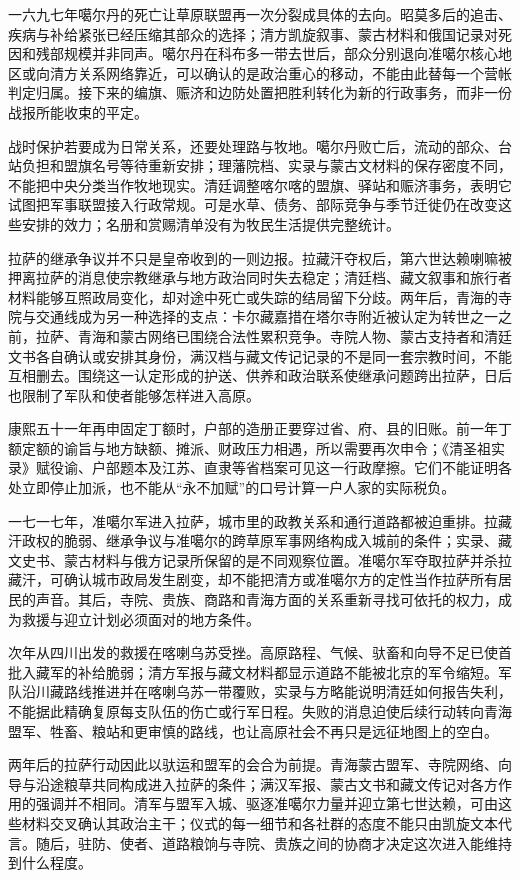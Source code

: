 一六九七年噶尔丹的死亡让草原联盟再一次分裂成具体的去向。昭莫多后的追击、疾病与补给紧张已经压缩其部众的选择；清方凯旋叙事、蒙古材料和俄国记录对死因和残部规模并非同声。噶尔丹在科布多一带去世后，部众分别退向准噶尔核心地区或向清方关系网络靠近，可以确认的是政治重心的移动，不能由此替每一个营帐判定归属。接下来的编旗、赈济和边防处置把胜利转化为新的行政事务，而非一份战报所能收束的平定。

战时保护若要成为日常关系，还要处理路与牧地。噶尔丹败亡后，流动的部众、台站负担和盟旗名号等待重新安排；理藩院档、实录与蒙古文材料的保存密度不同，不能把中央分类当作牧地现实。清廷调整喀尔喀的盟旗、驿站和赈济事务，表明它试图把军事联盟接入行政常规。可是水草、债务、部际竞争与季节迁徙仍在改变这些安排的效力；名册和赏赐清单没有为牧民生活提供完整统计。

拉萨的继承争议并不只是皇帝收到的一则边报。拉藏汗夺权后，第六世达赖喇嘛被押离拉萨的消息使宗教继承与地方政治同时失去稳定；清廷档、藏文叙事和旅行者材料能够互照政局变化，却对途中死亡或失踪的结局留下分歧。两年后，青海的寺院与交通线成为另一种选择的支点：卡尔藏嘉措在塔尔寺附近被认定为转世之一之前，拉萨、青海和蒙古网络已围绕合法性累积竞争。寺院人物、蒙古支持者和清廷文书各自确认或安排其身份，满汉档与藏文传记记录的不是同一套宗教时间，不能互相删去。围绕这一认定形成的护送、供养和政治联系使继承问题跨出拉萨，日后也限制了军队和使者能够怎样进入高原。

康熙五十一年再申固定丁额时，户部的造册正要穿过省、府、县的旧账。前一年丁额定额的谕旨与地方缺额、摊派、财政压力相遇，所以需要再次申令；《清圣祖实录》赋役谕、户部题本及江苏、直隶等省档案可见这一行政摩擦。它们不能证明各处立即停止加派，也不能从“永不加赋”的口号计算一户人家的实际税负。

一七一七年，准噶尔军进入拉萨，城市里的政教关系和通行道路都被迫重排。拉藏汗政权的脆弱、继承争议与准噶尔的跨草原军事网络构成入城前的条件；实录、藏文史书、蒙古材料与俄方记录所保留的是不同观察位置。准噶尔军夺取拉萨并杀拉藏汗，可确认城市政局发生剧变，却不能把清方或准噶尔方的定性当作拉萨所有居民的声音。其后，寺院、贵族、商路和青海方面的关系重新寻找可依托的权力，成为救援与迎立计划必须面对的地方条件。

次年从四川出发的救援在喀喇乌苏受挫。高原路程、气候、驮畜和向导不足已使首批入藏军的补给脆弱；清方军报与藏文材料都显示道路不能被北京的军令缩短。军队沿川藏路线推进并在喀喇乌苏一带覆败，实录与方略能说明清廷如何报告失利，不能据此精确复原每支队伍的伤亡或行军日程。失败的消息迫使后续行动转向青海盟军、牲畜、粮站和更审慎的路线，也让高原社会不再只是远征地图上的空白。

两年后的拉萨行动因此以驮运和盟军的会合为前提。青海蒙古盟军、寺院网络、向导与沿途粮草共同构成进入拉萨的条件；满汉军报、蒙古文书和藏文传记对各方作用的强调并不相同。清军与盟军入城、驱逐准噶尔力量并迎立第七世达赖，可由这些材料交叉确认其政治主干；仪式的每一细节和各社群的态度不能只由凯旋文本代言。随后，驻防、使者、道路粮饷与寺院、贵族之间的协商才决定这次进入能维持到什么程度。

